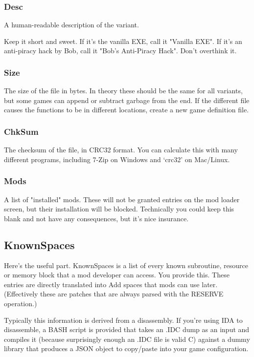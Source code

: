 \documentclass[12pt,a4paper,notitlepage]{article}
\begin{document}
\subsubsection{Desc}
A human-readable description of the variant.

Keep it short and sweet. If it's the vanilla EXE, call it "Vanilla EXE". If it's an anti-piracy hack by Bob, call it "Bob's Anti-Piracy Hack". Don't overthink it.

\subsubsection{Size}
The size of the file in bytes. In theory these should be the same for all variants, but some games can append or subtract garbage from the end. If the different file causes the functions to be in different locations, create a new game definition file.

\subsubsection{ChkSum}
The checksum of the file, in CRC32 format. You can calculate this with many different programs, including 7-Zip on Windows and `crc32' on Mac/Linux.

\subsubsection{Mods}
A list of "installed" mods. These will not be granted entries on the mod loader screen, but their installation will be blocked. Technically you could keep this blank and not have any consequences, but it's nice insurance.

\subsection{KnownSpaces}
Here's the useful part. KnownSpaces is a list of every known subroutine, resource or memory block that a mod developer can access. You provide this. These entries are directly translated into Add spaces that mods can use later. (Effectively these are patches that are always parsed with the RESERVE operation.)

Typically this information is derived from a disassembly. If you're using IDA to disassemble, a BASH script is provided that takes an .IDC dump as an input and compiles it (because surprisingly enough an .IDC file is valid C) against a dummy library that produces a JSON object to copy/paste into your game configuration.
\end{document}
